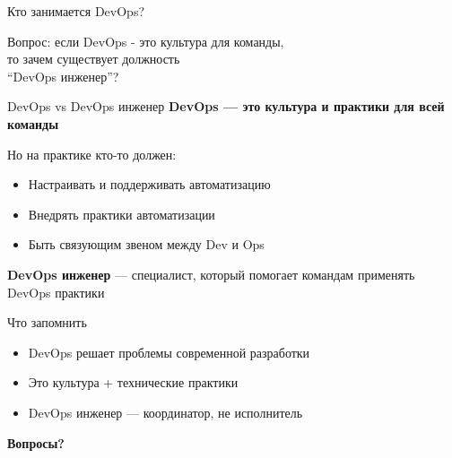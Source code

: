 \documentclass[aspectratio=169]{beamer}
\begin{document}
    \begin{frame}{Кто занимается DevOps?}
        \begin{center}
            \Large
            Вопрос: если DevOps - это культура для команды, \\
            то зачем существует должность \\
            \enquote{DevOps инженер}?
        \end{center}
    \end{frame}

    \begin{frame}{DevOps vs DevOps инженер}
        \textbf{DevOps — это культура и практики для всей команды}

        \vspace{0.5cm}

        Но на практике кто-то должен:
        \begin{itemize}
            \item Настраивать и поддерживать автоматизацию
            \item Внедрять практики автоматизации
            \item Быть связующим звеном между Dev и Ops
        \end{itemize}

        \vspace{0.5cm}

        \textbf{DevOps инженер} — специалист, который помогает командам применять DevOps практики
    \end{frame}

    \begin{frame}{Что запомнить}
        \begin{itemize}
            \item DevOps решает проблемы современной разработки
            \item Это культура + технические практики
            \item DevOps инженер — координатор, не исполнитель
        \end{itemize}

        \vspace{1cm}

        \begin{center}
            \textbf{Вопросы?}
        \end{center}
    \end{frame}
\end{document}
